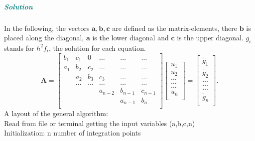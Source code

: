 \documentclass[%
oneside,                 %
final,                   %
10pt]{article}
\begin{document}
\subparagraph{\textcolor{teal}{Solution}}
In the following, the vectors $ \mathbf{a}, \mathbf{b}, \mathbf{c}$ are defined as the matrix-elements, there $ \mathbf{b}$ is placed along the diagonal, $\mathbf{a}$ is the lower diagonal and $\mathbf{c}$ is the upper diagonal. $g_i$ stands for $h^2f_i$, the solution for each equation. \\
\[
    \mathbf{A} = \begin{bmatrix}
                           b_1& c_1 & 0 &\dots   & \dots &\dots \\
                           a_1 & b_2 & c_2 &\dots &\dots &\dots \\
                           & a_2 & b_3 & c_3 & \dots & \dots \\
                           & \dots   & \dots &\dots   &\dots & \dots \\
                           &   &  &a_{n-2}  &b_{n-1}& c_{n-1} \\
                           &    &  &   &a_{n-1} & b_n \\
                      \end{bmatrix}\begin{bmatrix}
                           u_1\\
                           u_2\\
                           \dots \\
                          \dots  \\
                          \dots \\
                           u_n\\
                      \end{bmatrix}
  =\begin{bmatrix}
                           \tilde{g}_1\\
                           \tilde{g}_2\\
                           \dots \\
                           \dots \\
                          \dots \\
                           \tilde{g}_n\\
                      \end{bmatrix}.
\]
A layout of the general algorithm: \\
Read from file or terminal getting the input variables (a,b,c,n) \\
Initialization: n number of integration points \\
\end{document}
